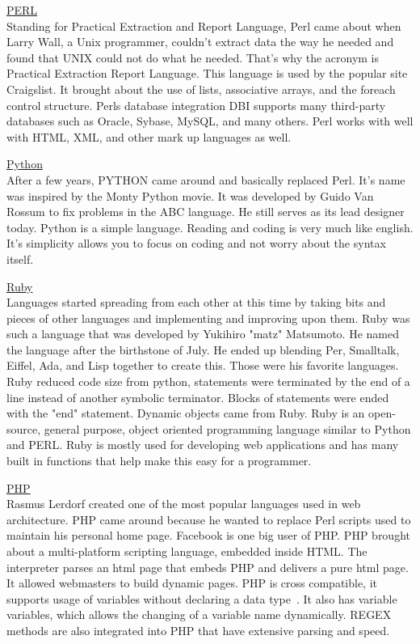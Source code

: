 \documentclass[letterpaper, 10 pt, conference]{IEEEtran}
\begin{document}
\noindent \underline{PERL}\\
Standing for Practical Extraction and Report Language, Perl came about when Larry Wall, a Unix programmer, couldn't extract data the way he needed and found that UNIX could not do what he needed. That's why the acronym is Practical Extraction Report Language. This language is used by the popular site Craigslist. It brought about the use of lists, associative arrays, and the foreach control structure. Perls database integration DBI supports many third-party databases such as Oracle, Sybase, MySQL, and many others. Perl works with well with HTML, XML, and other mark up languages as well. \bigskip

\noindent \underline{Python}\\
After a few years, PYTHON came around and basically replaced Perl. It's name was inspired by the Monty Python movie. It was developed by Guido Van Rossum to fix problems in the ABC language. He still serves as its lead designer today. Python is a simple language. Reading and coding is very much like english. It's simplicity allows you to focus on coding and not worry about the syntax itself. \bigskip

\noindent \underline{Ruby}\\
Languages started spreading from each other at this time by taking bits and pieces of other languages and implementing and improving upon them. Ruby was such a language that was developed by Yukihiro "matz" Matsumoto. He named the language after the birthstone of July. He ended up blending Per, Smalltalk, Eiffel, Ada, and Lisp together to create this. Those were his favorite languages.~\cite{History} Ruby reduced code size from python, statements were terminated by the end of a line instead of another symbolic terminator. Blocks of statements were ended with the "end" statement. Dynamic objects came from Ruby. Ruby is an open-source, general purpose, object oriented programming language similar to Python and PERL. Ruby is mostly used for developing web applications and has many built in functions that help make this easy for a programmer.\bigskip

\noindent \underline{PHP}\\
Rasmus Lerdorf created one of the most popular languages used in web architecture. PHP came around because he wanted to replace Perl scripts used to maintain his personal home page. Facebook is one big user of PHP. PHP brought about a multi-platform scripting language, embedded inside HTML. The interpreter parses an html page that embeds PHP and delivers a pure html page. It allowed webmasters to build dynamic pages. PHP is cross compatible, it supports usage of variables without declaring a data type~\cite{History}. It also has variable variables, which allows the changing of a variable name dynamically. REGEX methods are also integrated into PHP that have extensive parsing and speed. \bigskip
\end{document}
